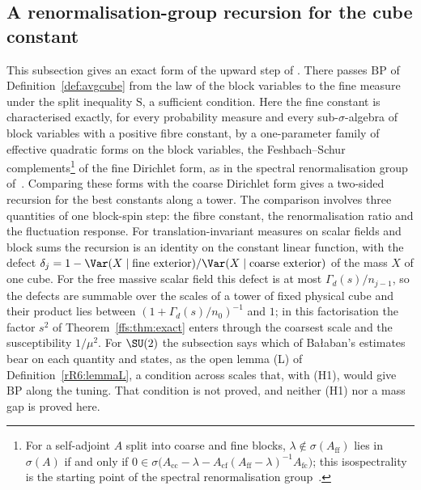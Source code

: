 \subsection{A renormalisation-group recursion for the cube constant}\label{rR6:sec}

This subsection gives an exact form of the upward step of
\cite[Sec.~X\,K]{BBLR26}. There \cite[Theorem~100]{BBLR26} passes
$\mathrm{BP}$ of Definition~\ref{def:avgcube} from the law of the block
variables to the fine measure under the split inequality $\mathrm S$, a
sufficient condition. Here the fine constant is characterised exactly, for
every probability measure and every sub-$\sigma$-algebra of block variables
with a positive fibre constant, by a one-parameter family of effective
quadratic forms on the block variables, the Feshbach--Schur complements\footnote{For a self-adjoint $A$ split into coarse and fine blocks, $\lambda\notin\sigma(A_{\mathrm{ff}})$ lies in $\sigma(A)$ if and only if $0\in\sigma\bigl(A_{\mathrm{cc}}-\lambda-A_{\mathrm{cf}}(A_{\mathrm{ff}}-\lambda)^{-1}A_{\mathrm{fc}}\bigr)$; this isospectrality is the starting point of the spectral renormalisation group~\cite{BFS98}.} of
the fine Dirichlet form, as in the spectral renormalisation group
of~\cite{BFS98}. Comparing these forms with the coarse Dirichlet form gives
a two-sided recursion for the best constants along a tower. The comparison
involves three quantities of one block-spin step: the fibre constant, the
renormalisation ratio and the fluctuation response. For
translation-invariant measures on scalar fields and block sums the
recursion is an identity on the constant linear function, with the defect
$\delta_j=1-\Var(X\mid\text{fine exterior})/\Var(X\mid\text{coarse
exterior})$ of the mass $X$ of one cube. For the free massive scalar field
this defect is at most $\Gamma_d(s)/n_{j-1}$, so the defects are summable
over the scales of a tower of fixed physical cube and their product lies
between $(1+\Gamma_d(s)/n_0)^{-1}$ and $1$; in this factorisation the
factor $s^2$ of Theorem~\ref{ffs:thm:exact} enters through the coarsest
scale and the susceptibility $1/\mu^2$. For $\SU(2)$ the subsection says
which of Ba{\l}aban's estimates bear on each quantity and states, as the
open lemma (L) of Definition~\ref{rR6:lemmaL}, a condition across scales
that, with (H1), would give $\mathrm{BP}$ along the tuning. That condition
is not proved, and neither (H1) nor a mass gap is proved here.

